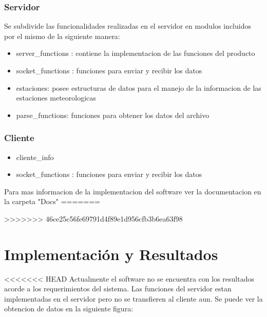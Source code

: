 \documentclass[10pt, a4paper,notitlepage]{article}
\begin{document}
{\subsubsection{Servidor}
Se subdivide las funcionalidades realizadas en el servidor en modulos incluidos por el mismo de la siguiente manera:
\begin{itemize}
	\item server\_functions : contiene la implementacion de las funciones del producto
	\item socket\_functions : funciones para enviar y recibir los datos
	\item estaciones: posee estructuras de datos para el manejo de la informacion de las estaciones meteorologicas
	\item parse\_functions: funciones para obtener los datos del archivo
\end{itemize}
\subsubsection{Cliente}
\begin{itemize}
	\item cliente\_info
	\item socket\_functions : funciones para enviar y recibir los datos
\end{itemize}

Para mas informacion de la implementacion del software ver la documentacion en la carpeta "Docs"
=======

>>>>>>> 46ce25c56fe69791d4f89e1d956cfb3b6ea63f98



\section{Implementación y Resultados}
<<<<<<< HEAD
Actualmente el software no se encuentra con los resultados acorde a los requerimientos del sistema. Las funciones del servidor estan implementadas en el servidor pero no se transfieren al cliente aun. Se puede ver la obtencion de datos en la siguiente figura:

}
\end{document}
